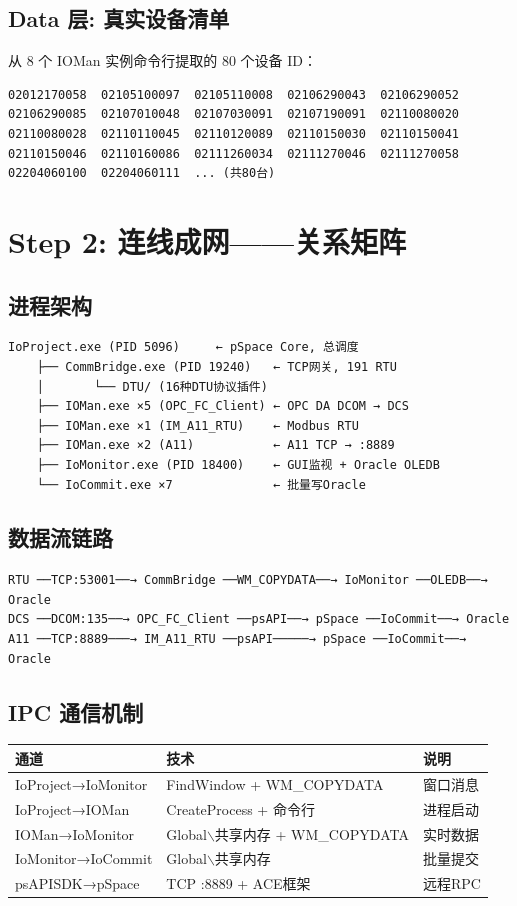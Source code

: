 \documentclass[12pt,a4paper]{ctexart}
\begin{document}
\subsection{Data 层: 真实设备清单}
从 8 个 IOMan 实例命令行提取的 80 个设备 ID：

\begin{verbatim}
02012170058  02105100097  02105110008  02106290043  02106290052
02106290085  02107010048  02107030091  02107190091  02110080020
02110080028  02110110045  02110120089  02110150030  02110150041
02110150046  02110160086  02111260034  02111270046  02111270058
02204060100  02204060111  ... (共80台)
\end{verbatim}

\section{Step 2: 连线成网——关系矩阵}

\subsection{进程架构}
\begin{verbatim}
IoProject.exe (PID 5096)     ← pSpace Core, 总调度
    ├── CommBridge.exe (PID 19240)   ← TCP网关, 191 RTU
    │       └── DTU/ (16种DTU协议插件)
    ├── IOMan.exe ×5 (OPC_FC_Client) ← OPC DA DCOM → DCS
    ├── IOMan.exe ×1 (IM_A11_RTU)    ← Modbus RTU
    ├── IOMan.exe ×2 (A11)           ← A11 TCP → :8889
    ├── IoMonitor.exe (PID 18400)    ← GUI监视 + Oracle OLEDB
    └── IoCommit.exe ×7              ← 批量写Oracle
\end{verbatim}

\subsection{数据流链路}
\begin{verbatim}
RTU ──TCP:53001──→ CommBridge ──WM_COPYDATA──→ IoMonitor ──OLEDB──→ Oracle
DCS ──DCOM:135──→ OPC_FC_Client ──psAPI──→ pSpace ──IoCommit──→ Oracle
A11 ──TCP:8889───→ IM_A11_RTU ──psAPI─────→ pSpace ──IoCommit──→ Oracle
\end{verbatim}

\subsection{IPC 通信机制}
\begin{table}[H]\centering
\begin{tabular}{lll}
\toprule
\textbf{通道} & \textbf{技术} & \textbf{说明} \\
\midrule
IoProject→IoMonitor & FindWindow + WM\_COPYDATA & 窗口消息 \\
IoProject→IOMan & CreateProcess + 命令行 & 进程启动 \\
IOMan→IoMonitor & Global$\backslash$共享内存 + WM\_COPYDATA & 实时数据 \\
IoMonitor→IoCommit & Global$\backslash$共享内存 & 批量提交 \\
psAPISDK→pSpace & TCP :8889 + ACE框架 & 远程RPC \\
\bottomrule
\end{tabular}
\end{table}
\end{document}
